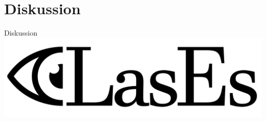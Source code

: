 \documentclass{beamer}
\begin{document}
    \section{Diskussion}
    \begin{frame}{Diskussion}
        \includegraphics[width=\textwidth]{../../docs/Pflichtenheft/graphics/LasEs-logo}
    \end{frame}
\end{document}
